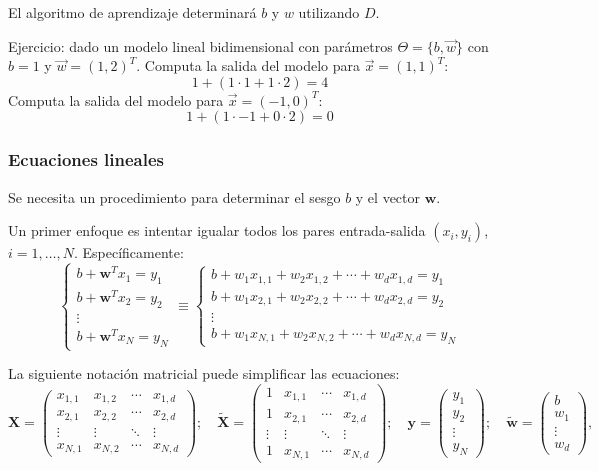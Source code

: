 El algoritmo de aprendizaje determinará $b$ y $w$ utilizando $D$.

Ejercicio: dado un modelo lineal bidimensional con parámetros $\Theta = \{ b, \vec{w}\}$ con $b = 1$ y $\vec{w} = (1,2)^T$. Computa la salida del modelo para $\vec{x} = (1,1)^T$:
$$1 + (1 \cdot 1 + 1 \cdot 2) = 4$$
 Computa la salida del modelo para $\vec{x} = (-1,0)^T$:
 $$1 + (1 \cdot -1 + 0 \cdot 2) = 0$$

\subsubsection{Ecuaciones lineales}
Se necesita un procedimiento para determinar el sesgo $b $ y el vector $\mathbf{w}$.

Un primer enfoque es intentar igualar todos los pares entrada-salida $(x_i, y_i)$, $i = 1, \ldots, N$. Específicamente:
$$
\begin{cases}
b + \mathbf{w}^T x_1 = y_1 \\
b + \mathbf{w}^T x_2 = y_2 \\
\vdots \\
b + \mathbf{w}^T x_N = y_N
\end{cases}
\equiv 
\begin{cases}
b + w_1 x_{1,1} + w_2 x_{1,2} + \cdots + w_d x_{1,d} = y_1 \\
b + w_1 x_{2,1} + w_2 x_{2,2} + \cdots + w_d x_{2,d} = y_2 \\
\vdots \\
b + w_1 x_{N,1} + w_2 x_{N,2} + \cdots + w_d x_{N,d} = y_N
\end{cases}
$$

La siguiente notación matricial puede simplificar las ecuaciones:
$$
\mathbf{X} =
\begin{pmatrix}
x_{1,1} & x_{1,2} & \cdots & x_{1,d} \\
x_{2,1} & x_{2,2} & \cdots & x_{2,d} \\
\vdots & \vdots & \ddots & \vdots \\
x_{N,1} & x_{N,2} & \cdots & x_{N,d}
\end{pmatrix}
;\quad \tilde{\mathbf{X}} =
\begin{pmatrix}
1 & x_{1,1} & \cdots & x_{1,d} \\
1 & x_{2,1} & \cdots & x_{2,d} \\
\vdots & \vdots & \ddots & \vdots \\
1 & x_{N,1} & \cdots & x_{N,d}
\end{pmatrix}
;\quad \mathbf{y} =
\begin{pmatrix}
y_1 \\
y_2 \\
\vdots \\
y_N
\end{pmatrix}
;\quad \tilde{\mathbf{w}} =
\begin{pmatrix}
b \\
w_1 \\
\vdots \\
w_d
\end{pmatrix},
$$

